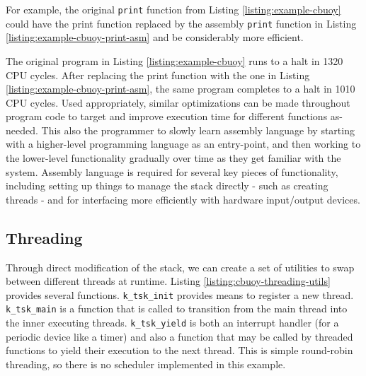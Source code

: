 \documentclass{article}
\begin{document}
For example, the original \texttt{print} function from Listing \ref{listing:example-cbuoy} could have the print function replaced by the assembly \texttt{print} function in Listing \ref{listing:example-cbuoy-print-asm} and be considerably more efficient.



The original program in Listing \ref{listing:example-cbuoy} runs to a halt in 1320 CPU cycles. After replacing the print function with the one in Listing \ref{listing:example-cbuoy-print-asm}, the same program completes to a halt in 1010 CPU cycles. Used appropriately, similar optimizations can be made throughout program code to target and improve execution time for different functions as-needed. This also the programmer to slowly learn assembly language by starting with a higher-level programming language as an entry-point, and then working to the lower-level functionality gradually over time as they get familiar with the system. Assembly language is required for several key pieces of functionality, including setting up things to manage the stack directly - such as creating threads - and for interfacing more efficiently with hardware input/output devices.

\subsection{Threading}

Through direct modification of the stack, we can create a set of utilities to swap between different threads at runtime. Listing \ref{listing:cbuoy-threading-utils} provides several functions. \texttt{k\_tsk\_init} provides means to register a new thread. \texttt{k\_tsk\_main} is a function that is called to transition from the main thread into the inner executing threads. \texttt{k\_tsk\_yield} is both an interrupt handler (for a periodic device like a timer) and also a function that may be called by threaded functions to yield their execution to the next thread. This is simple round-robin threading, so there is no scheduler implemented in this example.

\pagebreak


\end{document}
